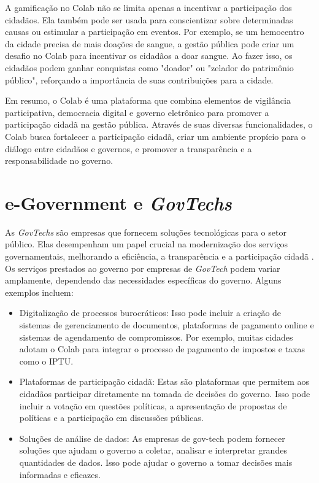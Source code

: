 A gamificação no Colab não se limita apenas a incentivar a participação dos cidadãos. Ela também pode ser usada para conscientizar sobre determinadas causas ou estimular a participação em eventos. Por exemplo, se um hemocentro da cidade precisa de mais doações de sangue, a gestão pública pode criar um desafio no Colab para incentivar os cidadãos a doar sangue. Ao fazer isso, os cidadãos podem ganhar conquistas como "doador" ou "zelador do patrimônio público", reforçando a importância de suas contribuições para a cidade.

Em resumo, o Colab é uma plataforma que combina elementos de vigilância participativa, democracia digital e governo eletrônico para promover a participação cidadã na gestão pública. Através de suas diversas funcionalidades, o Colab busca fortalecer a participação cidadã, criar um ambiente propício para o diálogo entre cidadãos e governos, e promover a transparência e a responsabilidade no governo.

\section{e-Government e \textit{GovTechs}}

As \textit{GovTechs} são empresas que fornecem soluções tecnológicas para o setor público. Elas desempenham um papel crucial na modernização dos serviços governamentais, melhorando a eficiência, a transparência e a participação cidadã \cite{2022_Kononenko}. Os serviços prestados ao governo por empresas de \textit{GovTech} podem variar amplamente, dependendo das necessidades específicas do governo. Alguns exemplos incluem:

\begin{itemize}
	\item Digitalização de processos burocráticos: Isso pode incluir a criação de sistemas de gerenciamento de documentos, plataformas de pagamento online e sistemas de agendamento de compromissos. Por exemplo, muitas cidades adotam o Colab para integrar o processo de pagamento de impostos e taxas como o IPTU.
	\item Plataformas de participação cidadã: Estas são plataformas que permitem aos cidadãos participar diretamente na tomada de decisões do governo. Isso pode incluir a votação em questões políticas, a apresentação de propostas de políticas e a participação em discussões públicas.
	\item Soluções de análise de dados: As empresas de gov-tech podem fornecer soluções que ajudam o governo a coletar, analisar e interpretar grandes quantidades de dados. Isso pode ajudar o governo a tomar decisões mais informadas e eficazes.
\end{itemize}


